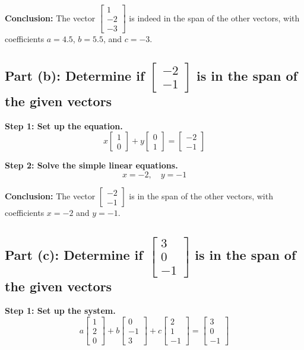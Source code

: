 \documentclass[12pt]{article}
\begin{document}
\textbf{Conclusion:} The vector \(\begin{bmatrix} 1 \\ -2 \\ -3 \end{bmatrix}\) is indeed in the span of the other vectors, with coefficients \(a = 4.5\), \(b = 5.5\), and \(c = -3\).

\subsection*{Part (b): Determine if \(\begin{bmatrix} -2 \\ -1 \end{bmatrix}\) is in the span of the given vectors}

\textbf{Step 1: Set up the equation.}
\[
x \begin{bmatrix} 1 \\ 0 \end{bmatrix} + y \begin{bmatrix} 0 \\ 1 \end{bmatrix} = \begin{bmatrix} -2 \\ -1 \end{bmatrix}
\]

\textbf{Step 2: Solve the simple linear equations.}
\[
x = -2, \quad y = -1
\]

\textbf{Conclusion:} The vector \(\begin{bmatrix} -2 \\ -1 \end{bmatrix}\) is in the span of the other vectors, with coefficients \(x = -2\) and \(y = -1\).

\subsection*{Part (c): Determine if \(\begin{bmatrix} 3 \\ 0 \\ -1 \end{bmatrix}\) is in the span of the given vectors}

\textbf{Step 1: Set up the system.}
\[
a \begin{bmatrix} 1 \\ 2 \\ 0 \end{bmatrix} + b \begin{bmatrix} 0 \\ -1 \\ 3 \end{bmatrix} + c \begin{bmatrix} 2 \\ 1 \\ -1 \end{bmatrix} = \begin{bmatrix} 3 \\ 0 \\ -1 \end{bmatrix}
\]
\end{document}

